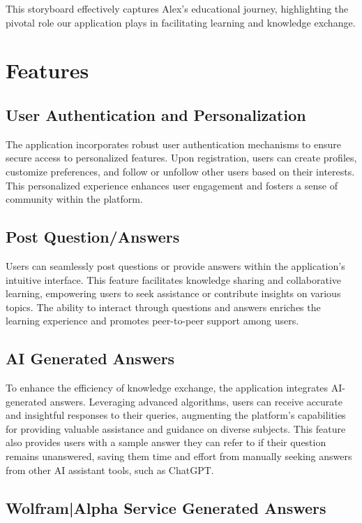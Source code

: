This storyboard effectively captures Alex's educational journey, highlighting the pivotal role our application plays in facilitating learning and knowledge exchange.


\section{Features}

\subsection{User Authentication and Personalization}

The application incorporates robust user authentication mechanisms to ensure secure access to personalized features. Upon registration, users can create profiles, customize preferences, and follow or unfollow other users based on their interests. This personalized experience enhances user engagement and fosters a sense of community within the platform.

\subsection{Post Question/Answers}

Users can seamlessly post questions or provide answers within the application's intuitive interface. This feature facilitates knowledge sharing and collaborative learning, empowering users to seek assistance or contribute insights on various topics. The ability to interact through questions and answers enriches the learning experience and promotes peer-to-peer support among users.

\subsection{AI Generated Answers}

To enhance the efficiency of knowledge exchange, the application integrates AI-generated answers. Leveraging advanced algorithms, users can receive accurate and insightful responses to their queries, augmenting the platform's capabilities for providing valuable assistance and guidance on diverse subjects. This feature also provides users with a sample answer they can refer to if their question remains unanswered, saving them time and effort from manually seeking answers from other AI assistant tools, such as ChatGPT.

\subsection{Wolfram|Alpha Service Generated Answers}

